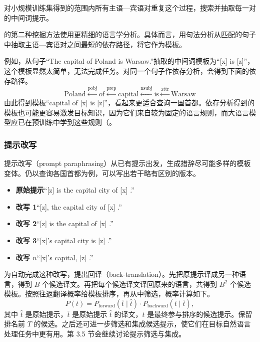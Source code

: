 对小规模训练集得到的范围内所有主语—宾语对重复这个过程，搜索并抽取每一对的中间词提示。

的第二种挖掘方法使用更精细的语言学分析。具体而言，用句法分析从匹配的句子中抽取主语—宾语对之间最短的依存路径，将它作为模板。

例如，从句子“The capital of Poland is Warsaw.”抽取的中间词模板为“[x] is [z]”，这个模板显然太简单，无法完成任务。对同一个句子作依存分析，会得到下面的依存路径。
\[
\text{Poland}\xleftarrow{\mathrm{pobj}}\text{of}
\xleftarrow{\mathrm{prep}}\text{capital}\xleftarrow{\mathrm{nsubj}}\text{is}
\xleftarrow{\mathrm{attr}}\text{Warsaw}
\]
由此得到模板“capital of [x] is [z]”，看起来更适合查询一国首都。依存分析得到的模板也可能更容易激发目标知识，因为它们来自较为固定的语言规则，而大语言模型应已在预训练中学到这些规则（。

\subsubsection{提示改写}
提示改写（prompt paraphrasing）从已有提示出发，生成措辞尽可能多样的模板变体。仍以查询各国首都为例，可以写出若干略有区别的版本。
\begin{itemize}
\item \textbf{原始提示}\enspace “[z] is the capital city of [x] .”
\item \textbf{改写 1}\enspace “[z], the capital city of [x] .”
\item \textbf{改写 2}\enspace “[z] is the capital of [x] .”
\item \textbf{改写 3}\enspace “[x]’s capital city is [z] .”
\item \textbf{改写 $n$}\enspace “[x]’s capital, [z] .”
\end{itemize}
为自动完成这种改写，提出回译（back-translation）。先把原提示译成另一种语言，得到 $B$ 个候选译文。再把每个候选译文译回原来的语言，共得到 $B^2$ 个候选模板。按照往返翻译概率给模板排序，再从中筛选，概率计算如下。
\begin{equation}
P(t)=P_{\mathrm{forward}}(\bar{t}\mid\hat{t})\cdot P_{\mathrm{backward}}(t\mid\bar{t}),
\tag{3.9}
\end{equation}
其中 $\hat{t}$ 是原始提示，$\bar{t}$ 是原始提示 $\hat{t}$ 的译文，$t$ 是最终参与排序的候选提示。保留排名前 $T$ 的候选。之后还可进一步筛选和集成候选提示，使它们在目标自然语言处理任务中更有用。第 3.5 节会继续讨论提示筛选与集成。

